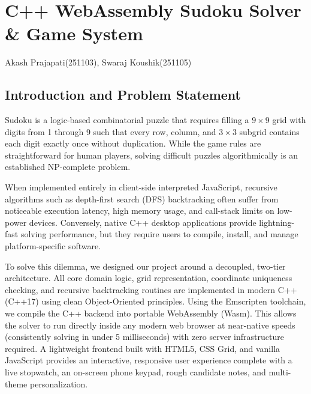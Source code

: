 \documentclass[12pt,a4paper,oneside]{book}
\makeatletter
\newcommand{\chapterauthor}[1]{%
  {\parindent0pt\vspace*{-15pt}%
  \linespread{1.1}\large\itshape\begin{flushright}#1\end{flushright}%
  \par\nobreak\vspace*{25pt}}
  \@afterheading%
}
\makeatother
\begin{document}
\mainmatter

\setcounter{chapter}{4}

\chapter{C++ WebAssembly Sudoku Solver \& Game System}
\chapterauthor{Akash Prajapati(251103), Swaraj Koushik(251105)}

\section{Introduction and Problem Statement}
Sudoku is a logic-based combinatorial puzzle that requires filling a $9 \times 9$ grid with digits from 1 through 9 such that every row, column, and $3 \times 3$ subgrid contains each digit exactly once without duplication. While the game rules are straightforward for human players, solving difficult puzzles algorithmically is an established NP-complete problem. 

When implemented entirely in client-side interpreted JavaScript, recursive algorithms such as depth-first search (DFS) backtracking often suffer from noticeable execution latency, high memory usage, and call-stack limits on low-power devices. Conversely, native C++ desktop applications provide lightning-fast solving performance, but they require users to compile, install, and manage platform-specific software.

To solve this dilemma, we designed our project around a decoupled, two-tier architecture. All core domain logic, grid representation, coordinate uniqueness checking, and recursive backtracking routines are implemented in modern C++ (C++17) using clean Object-Oriented principles. Using the Emscripten toolchain, we compile the C++ backend into portable WebAssembly (Wasm). This allows the solver to run directly inside any modern web browser at near-native speeds (consistently solving in under 5 milliseconds) with zero server infrastructure required. A lightweight frontend built with HTML5, CSS Grid, and vanilla JavaScript provides an interactive, responsive user experience complete with a live stopwatch, an on-screen phone keypad, rough candidate notes, and multi-theme personalization.
\end{document}
